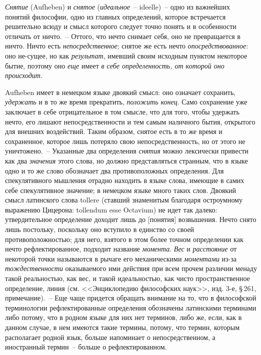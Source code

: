 \emph{Снятие} (Aufheben) и \emph{снятое} (\emph{идеальное}~-- ideelle)~--
одно из важнейших понятий философии, одно из главных
определений, которое встречается решительно всюду и
смысл которого следует точно понять и в особенности отличать
от ничто.~-- Оттого, что нечто снимает себя, оно
не превращается в ничто. Ничто есть \emph{непосредственное};
снятое же есть нечто \emph{опосредствованное}: оно не-сущее, но
как \emph{результат}, имевший своим исходным пунктом некоторое
бытие, поэтому оно \emph{еще} имеет \emph{в себе определенность,
от которой оно происходит}.

Aufheben имеет в немецком языке двоякий смысл: оно
означает сохранить, \emph{удержать} и в то же время прекратить,
\emph{положить конец}. Само сохранение уже заключает в
себе отрицательное в том смысле, что для того, чтобы
удержать нечто, его лишают непосредственности и тем самым
наличного бытия, открытого для внешних воздействий.
Таким образом, снятое есть в то же время и сохраненное,
которое лишь потеряло свою непосредственность,
но от этого не уничтожено.~-- Указанные два определения
\emph{снятия} можно лексически привести как два \emph{значения}
этого слова, но должно представляться странным, что в
языке одно и то же слово обозначает два противоположных
определения. Для спекулятивного мышления отрадно
находить в языке слова, имеющие в самих себе спекулятивное
значение; в немецком языке много таких слов.
Двоякий смысл латинского слова tollere (ставший знаменитым
благодаря остроумному выражению Цицерона:
tollendum esse Octavium)
не идет так далеко: утвердительное
определение доходит лишь до [понятия] возвышения.
Нечто снято лишь постольку, поскольку оно вступило
в единство со своей противоположностью; для него,
взятого в этом более точном определении как нечто рефлектированное,
подходит название \emph{момента}. \emph{Вес} и \emph{расстояние}
от некоторой точки называются в рычаге его механическими
\emph{моментами} из-за \emph{тождественности} оказываемого
ими действия при всем прочем различии менаду
такой реальностью, как вес, и такой идеальностью, как чисто
пространственное определение, линия (см. <<Энциклопедию
философских наук>>, изд. 3-е, \S\,261, примечание).~--
Еще чаще придется обращать внимание на то, что в
философской терминологии рефлектированные определения
обозначены латинскими терминами
либо потому,
что в родном языке для них нет терминов, либо же, если,
как в данном случае, в нем имеются такие термины, потому,
что термин, которым располагает родной язык,
больше напоминает о непосредственном, а иностранный
термин~-- больше о рефлектированном.

